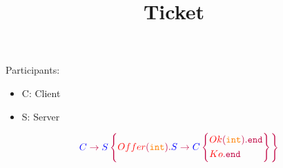 \documentclass{article}
\title{Ticket~\cite{BocchiMultiparty2013}}
\date{}
\begin{document}
	\maketitle

	Participants:
	\begin{itemize}
		\item C: Client
		\item S: Server
	\end{itemize}


	$$
	\gtComm{C}{S}{
		{{Offer}[int]{
				\gtComm{S}{C}{
					{{Ok}[int]{\gtEnd}}
					{{Ko}{\gtEnd}}
				}
		}}
	}
	$$

	
	
\end{document}
